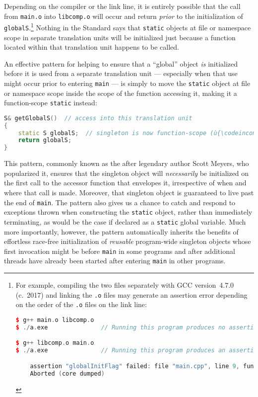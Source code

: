 \noindent Depending on the compiler or the link line, it is entirely possible that
the call from \lstinline!main.o! into \lstinline!libcomp.o! will occur and
return \emph{prior} to the initialization of
\lstinline!globalS!.{\cprotect\footnote{For example, compiling the two
files separately with GCC version~4.7.0 (c.~2017) and linking the
\lstinline!.o! files may generate an assertion error depending on the
order of the \lstinline!.o! files on the link line:

\begin{lstlisting}[language=C++, basicstyle={\ttfamily\footnotesize}]
$ g++ main.o libcomp.o
$ ./a.exe               // Running this program produces no assertion failure.

$ g++ libcomp.o main.o
$ ./a.exe               // Running this program produces an assertion failure.

    assertion "globalInitFlag" failed: file "main.cpp", line 9, function: int main()
    Aborted (core dumped)
\end{lstlisting}
      }} Nothing in the Standard says that \lstinline!static! objects at
file or namespace scope in separate translation units will be
initialized just because a function located within that translation unit
happens to be called.

An effective pattern for helping to ensure that a ``global'' object
\emph{is} initialized before it is used from a separate translation unit
--- especially when that use might occur prior to entering \lstinline!main!
--- is simply to move the \lstinline!static! object at file or namespace
scope inside the scope of the function accessing it, making it a
function-scope \lstinline!static! instead:

\begin{lstlisting}[language=C++]
S& getGlobalS()  // access into this translation unit
{
    static S globalS;  // singleton is now function-scope (ù{\codeincomments{static}}ù)
    return globalS;
}
\end{lstlisting}
    
\noindent This pattern, commonly known as the  after
legendary author Scott Meyers, who popularized it, ensures that the
singleton object will \emph{necessarily} be initialized on the first
call to the accessor function that envelopes it, irrespective of when
and where that call is made. Moreover, that singleton object is
guaranteed to live past the end of \lstinline!main!. The  pattern also gives us a chance to catch and respond to
exceptions thrown when constructing the \lstinline!static! object, rather
than immediately terminating, as would be the case if declared as a
\lstinline!static! global variable. Much more importantly, however, the
 pattern automatically inherits the benefits of
effortless race-free initialization of \emph{reusable} program-wide
singleton objects whose first invocation might be before \lstinline!main!
in some programs and after additional threads have already been started
after entering \lstinline!main! in other programs.

